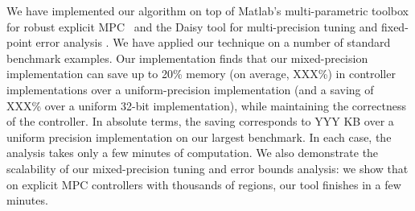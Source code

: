 We have implemented our algorithm on top of Matlab's multi-parametric toolbox 
for robust explicit MPC~\cite{matlabMPT}
and the Daisy tool for multi-precision tuning and fixed-point error analysis \cite{Daisy}.
We have applied our technique on a number of standard benchmark examples.
Our implementation finds that our mixed-precision implementation can save up to 20\% memory (on average, XXX\%) in controller
implementations over a uniform-precision implementation (and a saving of XXX\% over a uniform 32-bit implementation), while
maintaining the correctness of the controller.
In absolute terms, the saving corresponds to YYY KB over a uniform precision implementation on our largest benchmark.
In each case, the analysis takes only a few minutes of computation.
We also demonstrate the scalability of our mixed-precision tuning and error bounds analysis:
we show that on explicit MPC controllers with thousands of regions, our tool finishes in a few minutes.

